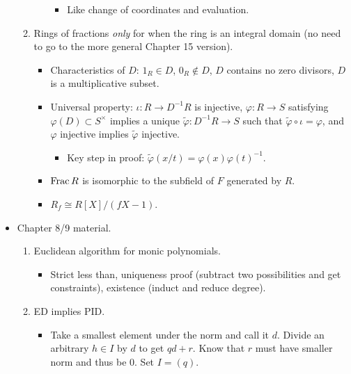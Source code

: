 \documentclass[../notes.tex]{subfiles}
\begin{document}
\begin{itemize}
\begin{enumerate}
\begin{itemize}
            \begin{itemize}
                \item Like change of coordinates and evaluation.
            \end{itemize}
        \end{itemize}
        \item Rings of fractions \emph{only} for when the ring is an integral domain (no need to go to the more general Chapter 15 version).
        \begin{itemize}
            \item Characteristics of $D$: $1_R\in D$, $0_R\notin D$, $D$ contains no zero divisors, $D$ is a multiplicative subset.
            \item Universal property: $\iota:R\to D^{-1}R$ is injective, $\varphi:R\to S$ satisfying $\varphi(D)\subset S^\times$ implies a unique $\tilde{\varphi}:D^{-1}R\to S$ such that $\tilde{\varphi}\circ\iota=\varphi$, and $\varphi$ injective implies $\tilde{\varphi}$ injective.
            \begin{itemize}
                \item Key step in proof: $\tilde{\varphi}(x/t)=\varphi(x)\varphi(t)^{-1}$.
            \end{itemize}
            \item $\operatorname{Frac} R$ is isomorphic to the subfield of $F$ generated by $R$.
            \item $R_f\cong R[X]/(fX-1)$.
        \end{itemize}
    \end{enumerate}
    \item Chapter 8/9 material.
    \begin{enumerate}
        \item Euclidean algorithm for monic polynomials.
        \begin{itemize}
            \item Strict less than, uniqueness proof (subtract two possibilities and get constraints), existence (induct and reduce degree).
        \end{itemize}
        \item ED implies PID.
        \begin{itemize}
            \item Take a smallest element under the norm and call it $d$. Divide an arbitrary $h\in I$ by $d$ to get $qd+r$. Know that $r$ must have smaller norm and thus be 0. Set $I=(q)$.
        \end{itemize}

\end{enumerate}
\end{itemize}
\end{document}
